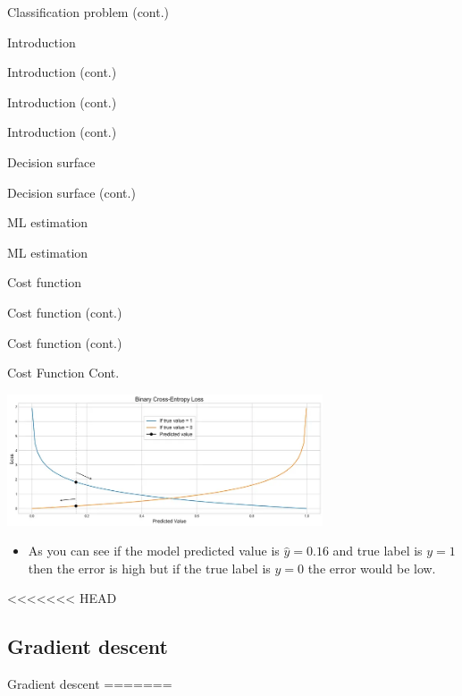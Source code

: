\documentclass[serif, aspectratio=169]{beamer}
\begin{document}
\begin{frame}{Classification problem (cont.)}
\begin{itemize}
\begin{frame}{Introduction}
\begin{itemize}
\begin{frame}{Introduction (cont.)}
\begin{frame}{Introduction (cont.)}
\begin{frame}{Introduction (cont.)}
\begin{frame}{Decision surface}
\begin{itemize}
\begin{frame}{Decision surface (cont.)}
\begin{frame}{ML estimation}
\begin{frame}{ML estimation}
\begin{itemize}
\begin{frame}{Cost function}
\begin{frame}{Cost function (cont.)}
\begin{itemize}
\begin{itemize}
\begin{frame}{Cost function (cont.)}
\begin{frame}{Cost Function Cont.}
\begin{center}
        \includegraphics[width=0.7\textwidth]{pic/BCE2.png}
    \end{center}
    
    
    \begin{itemize}
        \item As you can see if the model predicted value is $\hat{y}=0.16$ and true label is $y=1$ then the error is high but if the true label is $y=0$ the error would be low.
    \end{itemize}
    \vfill
\end{frame}


<<<<<<< HEAD
\subsection{Gradient descent}
\begin{frame}{Gradient descent}
=======

\end{frame}
\end{frame}
\end{itemize}
\end{itemize}
\end{frame}
\end{frame}
\end{itemize}
\end{frame}
\end{frame}
\end{frame}
\end{itemize}
\end{frame}
\end{frame}
\end{frame}
\end{frame}
\end{itemize}
\end{frame}
\end{itemize}
\end{frame}
\end{document}
